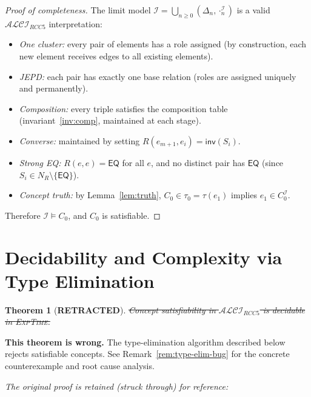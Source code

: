 \documentclass[a4paper,11pt]{article}
\newtheorem{theorem}{Theorem}[section]
\theoremstyle{definition}
\newcommand{\ALCIRCC}[1]{\ensuremath{\mathcal{ALCI}_{\mathit{RCC#1}}}}
\newcommand{\NR}{\ensuremath{N_R}}
\newcommand{\interp}{\ensuremath{\mathcal{I}}}
\newcommand{\EQ}{\ensuremath{\mathsf{EQ}}}
\newcommand{\inv}{\ensuremath{\mathsf{inv}}}
\newcommand{\EXPTIME}{\textsc{ExpTime}}
\begin{document}
\begin{proof}[Proof of completeness]
The limit model $\interp = \bigcup_{n \geq 0} (\Delta_n,
\cdot^{\interp}_n)$ is a valid $\ALCIRCC{5}$ interpretation:
\begin{itemize}[nosep]
  \item \emph{One cluster:} every pair of elements has a role
    assigned (by construction, each new element receives edges to all
    existing elements).
  \item \emph{JEPD:} each pair has exactly one base relation (roles
    are assigned uniquely and permanently).
  \item \emph{Composition:} every triple satisfies the composition
    table (invariant~\ref{inv:comp}, maintained at each stage).
  \item \emph{Converse:} maintained by setting $R(e_{m+1}, e_i) =
    \inv(S_i)$.
  \item \emph{Strong EQ:} $R(e, e) = \EQ$ for all $e$, and no
    distinct pair has $\EQ$ (since $S_i \in \NR \setminus \{\EQ\}$).
  \item \emph{Concept truth:} by Lemma~\ref{lem:truth}, $C_0 \in
    \tau_0 = \tau(e_1)$ implies $e_1 \in C_0^{\interp}$.
\end{itemize}

\noindent
Therefore $\interp \models C_0$, and $C_0$ is satisfiable.
\end{proof}

\section{Decidability and Complexity via Type Elimination}
\label{sec:complexity}

\begin{theorem}[\textbf{RETRACTED}]
\label{thm:complexity}
\sout{Concept satisfiability in $\ALCIRCC{5}$ is decidable in
\EXPTIME.}
\end{theorem}

\noindent
\textbf{This theorem is wrong.}  The type-elimination algorithm
described below rejects satisfiable concepts.  See
Remark~\ref{rem:type-elim-bug} for the concrete counterexample and
root cause analysis.

\medskip
\noindent
\emph{The original proof is retained (struck through) for reference:}
\end{document}
